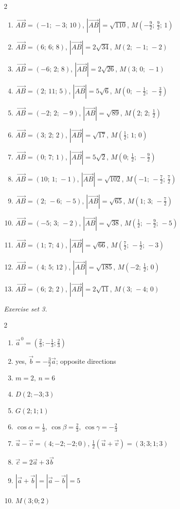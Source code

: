 \begin{multicols}{2}
\begin{enumerate}[label=\arabic*., leftmargin=*, itemsep=1pt]
\item $\overrightarrow{AB}=(-1;\,-3;\,10)$, $|\overrightarrow{AB}|=\sqrt{110}$, $M(-\frac{9}{2};\,\frac{9}{2};\,1)$
\item $\overrightarrow{AB}=(6;\,6;\,8)$, $|\overrightarrow{AB}|=2 \sqrt{34}$, $M(2;\,-1;\,-2)$
\item $\overrightarrow{AB}=(-6;\,2;\,8)$, $|\overrightarrow{AB}|=2 \sqrt{26}$, $M(3;\,0;\,-1)$
\item $\overrightarrow{AB}=(2;\,11;\,5)$, $|\overrightarrow{AB}|=5 \sqrt{6}$, $M(0;\,-\frac{1}{2};\,-\frac{3}{2})$
\item $\overrightarrow{AB}=(-2;\,2;\,-9)$, $|\overrightarrow{AB}|=\sqrt{89}$, $M(2;\,2;\,\frac{1}{2})$
\item $\overrightarrow{AB}=(3;\,2;\,2)$, $|\overrightarrow{AB}|=\sqrt{17}$, $M(\frac{1}{2};\,1;\,0)$
\item $\overrightarrow{AB}=(0;\,7;\,1)$, $|\overrightarrow{AB}|=5 \sqrt{2}$, $M(0;\,\frac{1}{2};\,-\frac{9}{2})$
\item $\overrightarrow{AB}=(10;\,1;\,-1)$, $|\overrightarrow{AB}|=\sqrt{102}$, $M(-1;\,-\frac{7}{2};\,\frac{7}{2})$
\item $\overrightarrow{AB}=(2;\,-6;\,-5)$, $|\overrightarrow{AB}|=\sqrt{65}$, $M(1;\,3;\,-\frac{7}{2})$
\item $\overrightarrow{AB}=(-5;\,3;\,-2)$, $|\overrightarrow{AB}|=\sqrt{38}$, $M(\frac{1}{2};\,-\frac{9}{2};\,-5)$
\item $\overrightarrow{AB}=(1;\,7;\,4)$, $|\overrightarrow{AB}|=\sqrt{66}$, $M(\frac{7}{2};\,-\frac{1}{2};\,-3)$
\item $\overrightarrow{AB}=(4;\,5;\,12)$, $|\overrightarrow{AB}|=\sqrt{185}$, $M(-2;\,\frac{1}{2};\,0)$
\item $\overrightarrow{AB}=(6;\,2;\,2)$, $|\overrightarrow{AB}|=2 \sqrt{11}$, $M(3;\,-4;\,0)$
\end{enumerate}
\end{multicols}
\par\noindent\emph{Exercise set 3.}\nopagebreak
\begin{multicols}{2}\raggedright
\begin{enumerate}[label=\arabic*., leftmargin=*, itemsep=1pt]
\item $\vec a^{\,0}=(\frac23;-\frac13;\frac23)$
\item yes, $\vec b=-\frac32\vec a$; opposite directions
\item $m=2,\ n=6$
\item $D(2;-3;3)$
\item $G(2;1;1)$
\item $\cos\alpha=\frac13,\ \cos\beta=\frac23,\ \cos\gamma=-\frac23$
\item $\vec u-\vec v=(4;-2;-2;0)$, $\frac12(\vec u+\vec v)=(3;3;1;3)$
\item $\vec c=2\vec a+3\vec b$
\item $|\vec a+\vec b|=|\vec a-\vec b|=5$
\item $M(3;0;2)$
\end{enumerate}
\end{multicols}
